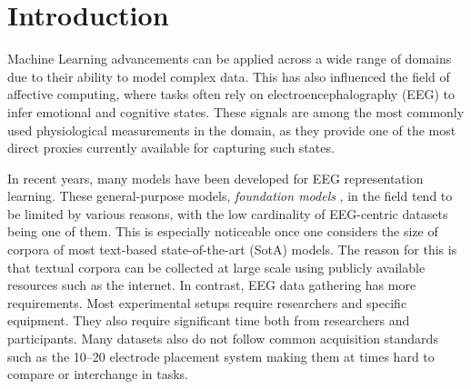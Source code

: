 
\chapter{Introduction}
\label{cap:introduzione}
Machine Learning advancements can be applied across a wide range of domains due to their ability to model complex data.
This has also influenced the field of affective computing, where tasks often rely on electroencephalography (EEG) to infer emotional and cognitive states.
These signals  are among the most commonly used physiological measurements in the domain, as they provide one of the most direct proxies currently available for capturing such states. \cite{RAHMAN2021104696}

In recent years, many models have been developed for EEG representation learning.
These general-purpose models, \textit{foundation models} \cite{Schneider2024}, in the field tend to be limited by various reasons, with the low cardinality of EEG-centric datasets being one of them.
This is especially noticeable once one considers the size of corpora of most text-based state-of-the-art (SotA) models.
The reason for this is that textual corpora can be collected at large scale using publicly available resources such as the internet.
In contrast, EEG data gathering has more requirements.
Most experimental setups require researchers and specific equipment.
They also require significant time both from researchers and participants.
Many datasets also do not follow common acquisition standards such as the 10–20 electrode placement system making them at times hard to compare or interchange in tasks.

